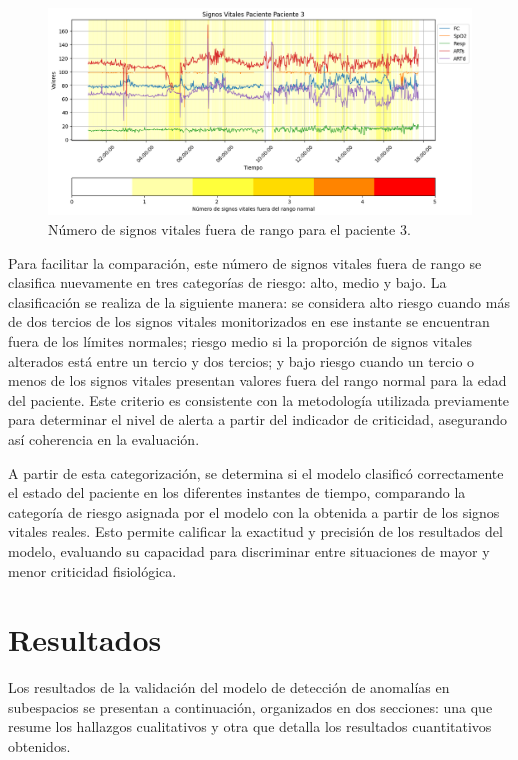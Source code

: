 \begin{figure}[ht]
  \centering
  \includegraphics[width=\textwidth]{Images/patient3_signos_vitales_fuera_de_rango_2.png}
  \caption{Número de signos vitales fuera de rango para el paciente 3.}
  \label{fig:patient3_signos_vitales_fuera_de_rango}
\end{figure}

Para facilitar la comparación, este número de signos vitales fuera de rango se clasifica nuevamente en tres categorías de riesgo: alto, medio y bajo. La clasificación se realiza de la siguiente manera: se considera alto riesgo cuando más de dos tercios de los signos vitales monitorizados en ese instante se encuentran fuera de los límites normales; riesgo medio si la proporción de signos vitales alterados está entre un tercio y dos tercios; y bajo riesgo cuando un tercio o menos de los signos vitales presentan valores fuera del rango normal para la edad del paciente. Este criterio es consistente con la metodología utilizada previamente para determinar el nivel de alerta a partir del indicador de criticidad, asegurando así coherencia en la evaluación.

A partir de esta categorización, se determina si el modelo clasificó correctamente el estado del paciente en los diferentes instantes de tiempo, comparando la categoría de riesgo asignada por el modelo con la obtenida a partir de los signos vitales reales. Esto permite calificar la exactitud y precisión de los resultados del modelo, evaluando su capacidad para discriminar entre situaciones de mayor y menor criticidad fisiológica.

\section{Resultados}

Los resultados de la validación del modelo de detección de anomalías en subespacios se presentan a continuación, organizados en dos secciones: una que resume los hallazgos cualitativos y otra que detalla los resultados cuantitativos obtenidos.


